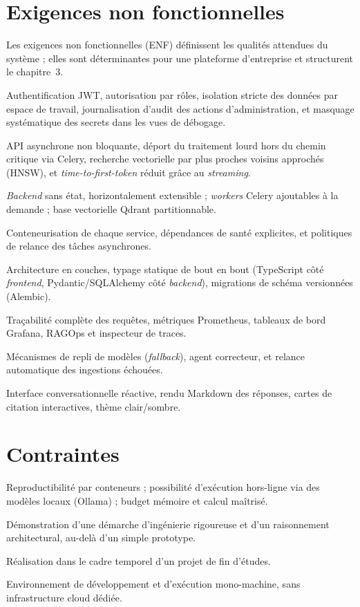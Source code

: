 \documentclass[12pt,a4paper,oneside]{report}
\begin{document}
\section{Exigences non fonctionnelles}
Les exigences non fonctionnelles (ENF) définissent les qualités attendues du
système ; elles sont déterminantes pour une plateforme d'entreprise et structurent
le chapitre~3.

\begin{description}[leftmargin=2.2cm,style=nextline]
\item[Sécurité] Authentification JWT, autorisation par rôles, isolation stricte
des données par espace de travail, journalisation d'audit des actions
d'administration, et masquage systématique des secrets dans les vues de débogage.
\item[Performance] API asynchrone non bloquante, déport du traitement lourd hors
du chemin critique via Celery, recherche vectorielle par plus proches voisins
approchés (HNSW), et \emph{time-to-first-token} réduit grâce au \emph{streaming}.
\item[Scalabilité] \textit{Backend} sans état, horizontalement extensible ;
\emph{workers} Celery ajoutables à la demande ; base vectorielle Qdrant
partitionnable.
\item[Disponibilité] Conteneurisation de chaque service, dépendances de santé
explicites, et politiques de relance des tâches asynchrones.
\item[Maintenabilité] Architecture en couches, typage statique de bout en bout
(TypeScript côté \textit{frontend}, Pydantic/SQLAlchemy côté \textit{backend}),
migrations de schéma versionnées (Alembic).
\item[Observabilité] Traçabilité complète des requêtes, métriques Prometheus,
tableaux de bord Grafana, RAGOps et inspecteur de traces.
\item[Fiabilité] Mécanismes de repli de modèles (\emph{fallback}), agent
correcteur, et relance automatique des ingestions échouées.
\item[Utilisabilité] Interface conversationnelle réactive, rendu Markdown des
réponses, cartes de citation interactives, thème clair/sombre.
\end{description}

\section{Contraintes}
\begin{description}[leftmargin=2.4cm,style=nextline]
\item[Techniques] Reproductibilité par conteneurs ; possibilité d'exécution
hors-ligne via des modèles locaux (Ollama) ; budget mémoire et calcul maîtrisé.
\item[Académiques] Démonstration d'une démarche d'ingénierie rigoureuse et d'un
raisonnement architectural, au-delà d'un simple prototype.
\item[Temps] Réalisation dans le cadre temporel d'un projet de fin d'études.
\item[Ressources] Environnement de développement et d'exécution mono-machine,
sans infrastructure cloud dédiée.
\end{description}
\end{document}
